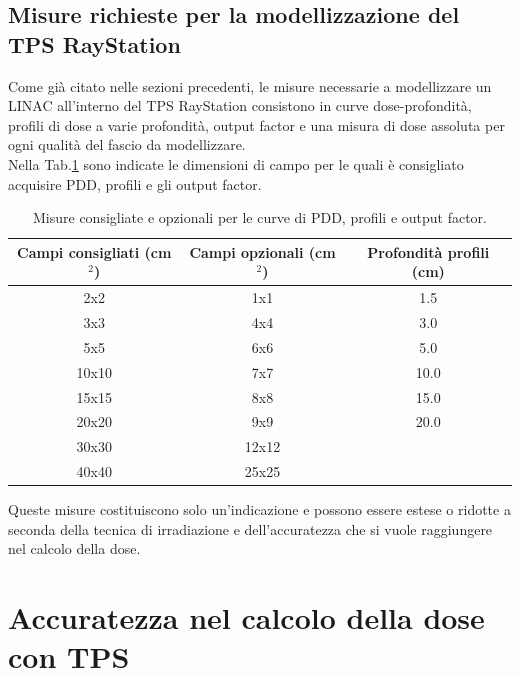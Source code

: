 \subsection{Misure richieste per la modellizzazione del TPS RayStation}
Come già citato nelle sezioni precedenti, le misure necessarie a modellizzare un LINAC all'interno del TPS RayStation consistono in curve dose-profondità, profili di dose a varie profondità, output factor e una misura di dose assoluta per ogni qualità del fascio da modellizzare.\\
Nella Tab.\ref{tab:meas} sono indicate le dimensioni di campo per le quali è consigliato acquisire PDD, profili e gli output factor.
\begin{table}
\begin{tabular}{ccc}
Campi consigliati (cm$^2$) & Campi opzionali (cm$^2$) & Profondità profili (cm)\\
\hline\hline
2x2 & 1x1 & 1.5\\
3x3 & 4x4 & 3.0\\
5x5 & 6x6 & 5.0\\
10x10 & 7x7 & 10.0\\
15x15 & 8x8 & 15.0\\
20x20 & 9x9 & 20.0\\
30x30 & 12x12 & \\
40x40 & 25x25 & \\
\hline\hline
\end{tabular}
\caption{Misure consigliate e opzionali per le curve di PDD, profili e output factor.}
\label{tab:meas}
\end{table}
Queste misure costituiscono solo un'indicazione e possono essere estese o ridotte a seconda della tecnica di irradiazione e dell'accuratezza che si vuole raggiungere nel calcolo della dose.

\section{Accuratezza nel calcolo della dose con TPS}
